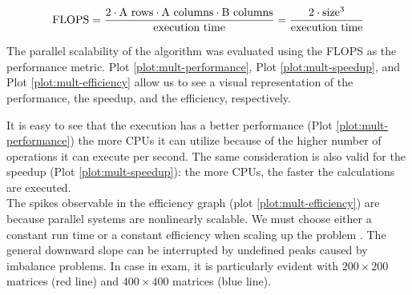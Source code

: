 \begin{equation}
    \label{eq:flops}
    \textnormal{FLOPS}=\frac{%
            2 \cdot \textnormal{A rows} \cdot \textnormal{A columns} \cdot %
            \textnormal{B columns}
        }{\textnormal{execution time}}=
        \frac{%
            2 \cdot \textnormal{size}^3}{\textnormal{execution time}}
\end{equation}



The parallel scalability of the algorithm was evaluated using the FLOPS as the %
performance metric. Plot \ref{plot:mult-performance}, Plot \ref{plot:mult-speedup}, %
and Plot \ref{plot:mult-efficiency} allow us to see a visual representation of the %
performance, the speedup, and the efficiency, respectively.





It is easy to see that the execution has a better performance (Plot \ref{plot:mult-performance}) %
the more CPUs it can utilize because of the higher number of operations it can %
execute per second. The same consideration is also valid for the speedup %
(Plot \ref{plot:mult-speedup}): the more CPUs, the faster the calculations are %
executed. \\
The spikes observable in the efficiency graph (plot \ref{plot:mult-efficiency}) %
are because parallel systems are nonlinearly scalable. We must choose %
either a constant run time or a constant efficiency when scaling up the problem %
\cite{scalability}. The general downward slope can be interrupted by undefined %
peaks caused by imbalance problems. In case in exam, it is particularly evident with %
$200\times200$ matrices (red line) and $400\times400$ matrices (blue line).
